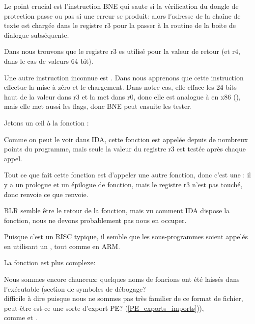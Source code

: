 Le point crucial est l'instruction \ac{BNE} qui saute si la vérification du dongle
de protection passe ou pas si une erreur se produit: alors l'adresse de la chaîne
de texte est chargée dans le registre r3 pour la passer à la routine de la boite de
dialogue subséquente.

Dans \PPCABI nous trouvons que le registre r3 es utilisé pour la valeur de retour
(et r4, dans le cas de valeurs 64-bit).

Une autre instruction inconnue est .
Dans \PPC nous apprenons que cette instruction effectue la mise à zéro et le chargement.
Dans notre cas, elle efface les 24 bits haut de la valeur dans r3 et la met dans
r0, donc elle est analogue à \MOVZX en x86 (), mais elle met aussi les
flags, donc \ac{BNE} peut ensuite les tester.

Jetons un \oe{}il à la fonction :



Comme on peut le voir dans \ac{IDA}, cette fonction est appelée depuis de nombreux
points du programme, mais seule la valeur du registre r3 est testée après chaque
appel.

Tout ce que fait cette fonction est d'appeler une autre fonction, donc c'est une
:
il y a un prologue et un épilogue de fonction, mais le registre r3 n'est pas touché,
donc  renvoie ce que  renvoie.

\ac{BLR} semble être le retour de la fonction, mais vu comment \ac{IDA} dispose la
fonction, nous ne devons probablement pas nous en occuper.

Puisque c'est un \ac{RISC} typique, il semble que les sous-programmes soient appelés
en utilisant un , tout comme en ARM.

La fonction  est plus complexe:




Nous sommes encore chanceux: quelques noms de foncions ont été laissés dans l'exécutable
(section de symboles de débogage?\\
difficile à dire puisque nous ne sommes pas très familier de ce format de fichier,
peut-être est-ce une sorte d'export PE? (\ref{PE_exports_imports})),\\ %
comme  et .

